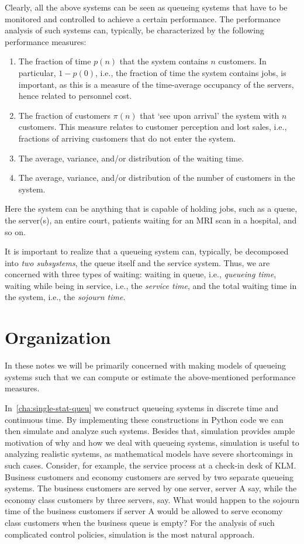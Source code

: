 Clearly, all the above systems can be seen as queueing systems that
have to be monitored and controlled to achieve a certain
performance. The performance analysis of such systems can, typically,
be characterized by the following performance measures:
\begin{enumerate}
\item The fraction of time $p(n)$ that the system contains $n$ customers.
  In particular, $1-p(0)$, i.e., the fraction of time the system contains jobs, is important, as this is a measure of the time-average occupancy of the servers, hence related to personnel cost.
\item The fraction of customers $\pi(n)$ that `see upon arrival' the system with $n$ customers.
  This measure relates to customer perception and lost sales, i.e., fractions of arriving customers that do not enter the system.
\item The average, variance, and/or distribution of the waiting time.
\item The average, variance, and/or distribution of the number of customers in the system.\
\end{enumerate}
Here the system can be anything that is capable of holding jobs, such
as a queue, the server(s), an entire court, patients waiting for
an MRI scan in a hospital, and so on.

It is important to realize that a queueing system can, typically, be
decomposed into \emph{two subsystems}, the queue itself and the
service system. Thus, we are concerned with three types of waiting:
waiting in queue, i.e., \emph{queueing time}, waiting while being in
service, i.e., the \emph{service time}, and the total waiting time in
the system, i.e., the \emph{sojourn time}.

\section*{Organization}


In these notes we will be primarily concerned with making models of queueing systems such that we can compute or estimate the above-mentioned performance measures.

In~\cref{cha:single-stat-queu} we construct queueing systems in discrete time and continuous time.
By implementing these constructions in Python code we can then simulate and analyze such systems.
Besides that, simulation provides ample motivation of why and how we deal with queueing systems, simulation is useful to analyzing realistic systems, as mathematical models have severe shortcomings in such cases.
Consider, for example, the service process at a check-in desk of KLM.
Business customers and economy customers are served by two separate queueing systems.
The business customers are served by one server, server A say, while the economy class customers by three servers, say.
What would happen to the sojourn time of the business customers if server A would be allowed to serve economy class customers when the business queue is empty?
For the analysis of such complicated control policies, simulation is the most natural approach.

